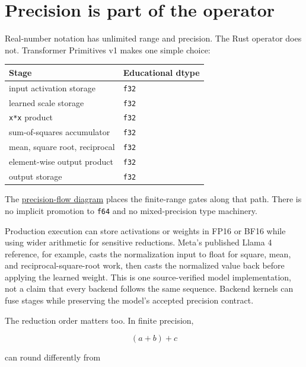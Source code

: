 \section{Precision is part of the
operator}\label{precision-is-part-of-the-operator}

Real-number notation has unlimited range and precision. The Rust
operator does not. Transformer Primitives v1 makes one simple choice:

{\def\LTcaptype{none} %
\begin{longtable}[]{@{}ll@{}}
\toprule\noalign{}
Stage & Educational dtype \\
\midrule\noalign{}
\endhead
\bottomrule\noalign{}
\endlastfoot
input activation storage & \texttt{f32} \\
learned scale storage & \texttt{f32} \\
\texttt{x*x} product & \texttt{f32} \\
sum-of-squares accumulator & \texttt{f32} \\
mean, square root, reciprocal & \texttt{f32} \\
element-wise output product & \texttt{f32} \\
output storage & \texttt{f32} \\
\end{longtable}
}

The
\href{https://github.com/hermonai/inside-the-llm-engine/blob/astra-visual-rewrite/diagrams/transformer/normalization-precision-flow.txt}{precision-flow
diagram} places the finite-range gates along that path. There is no
implicit promotion to \texttt{f64} and no mixed-precision type
machinery.

Production execution can store activations or weights in FP16 or BF16
while using wider arithmetic for sensitive reductions. Meta's published
Llama 4 reference, for example, casts the normalization input to float
for square, mean, and reciprocal-square-root work, then casts the
normalized value back before applying the learned weight. This is one
source-verified model implementation, not a claim that every backend
follows the same sequence. Backend kernels can fuse stages while
preserving the model's accepted precision contract.

The reduction order matters too. In finite precision,

\begin{equation}
(a+b)+c
\end{equation}

can round differently from


